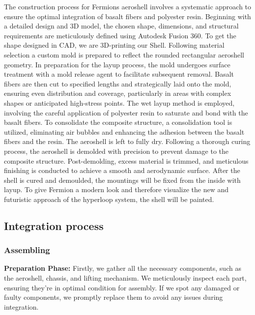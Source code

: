 The construction process for Fermions aeroshell involves a systematic approach to ensure the optimal integration of basalt fibers and polyester resin. Beginning with a detailed design and 3D model, the chosen shape, dimensions, and structural requirements are meticulously defined using Autodesk Fusion 360. To get the shape designed in CAD, we are 3D-printing our Shell. Following material selection a custom mold is prepared to reflect the rounded rectangular aeroshell geometry. \newline
In preparation for the layup process, the mold undergoes surface treatment with a mold release agent to facilitate subsequent removal. Basalt fibers are then cut to specified lengths and strategically laid onto the mold, ensuring even distribution and coverage, particularly in areas with complex shapes or anticipated high-stress points. The wet layup method is employed, involving the careful application of polyester resin to saturate and bond with the basalt fibers. \newline
To consolidate the composite structure, a consolidation tool is utilized, eliminating air bubbles and enhancing the adhesion between the basalt fibers and the resin. The aeroshell is left to fully dry. Following a thorough curing process, the aeroshell is demolded with precision to prevent damage to the composite structure. \newline
Post-demolding, excess material is trimmed, and meticulous finishing is conducted to achieve a smooth and aerodynamic surface. After the shell is cured and demoulded, the mountings will be fixed from the inside with layup. To give Fermion a modern look and therefore visualize the new and futuristic approach of the hyperloop system, the shell will be painted. \newline

\subsection{Integration process}
\subsubsection{Assembling}
\textbf{Preparation Phase:} 
Firstly, we gather all the necessary components, such as the aeroshell, chassis, and lifting mechanism. We meticulously inspect each part, ensuring they're in optimal condition for assembly. If we spot any damaged or faulty components, we promptly replace them to avoid any issues during integration.

